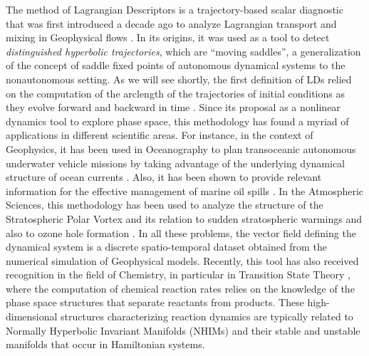 \documentclass[8pt]{article}
\begin{document}
The method of Lagrangian Descriptors is a trajectory-based scalar diagnostic that was first introduced a decade ago to analyze Lagrangian transport and mixing in Geophysical flows \cite{madrid2009,mendoza2010}. In its origins, it was used as a tool to detect \textit{distinguished hyperbolic trajectories}, which are ``moving saddles'', a generalization of the concept of saddle fixed points of autonomous dynamical systems to the nonautonomous setting. As we will see shortly, the first definition of LDs relied on the computation of the arclength of the trajectories of initial conditions as they evolve forward and backward in time \cite{mendoza2010,mancho2013lagrangian}. Since its proposal as a nonlinear dynamics tool to explore phase space, this methodology has found a myriad of applications in different scientific areas. For instance, in the context of Geophysics, it has been used in Oceanography to plan transoceanic autonomous underwater vehicle missions by taking advantage of the underlying dynamical structure of ocean currents \cite{ramos2018}. Also, it has been shown to provide relevant information for the effective management of marine oil spills \cite{gg2016}. In the Atmospheric Sciences, this methodology has been used to analyze the structure of the Stratospheric Polar Vortex and its relation to sudden stratospheric warmings and also to ozone hole formation \cite{alvaro1,alvaro2,curbelo2019a,curbelo2019b}. In all these problems, the vector field defining the dynamical system is a discrete spatio-temporal dataset obtained from the numerical simulation of Geophysical models. Recently, this tool has also received recognition in the field of Chemistry, in particular in Transition State Theory \cite{craven2015lagrangian,craven2016deconstructing,craven2017lagrangian,revuelta2019unveiling}, where the computation of chemical reaction rates relies on the knowledge of the phase space structures that separate reactants from products. These high-dimensional structures characterizing reaction dynamics are typically related to Normally Hyperbolic Invariant Manifolds (NHIMs) and their stable and unstable manifolds that occur in Hamiltonian systems.
\end{document}
